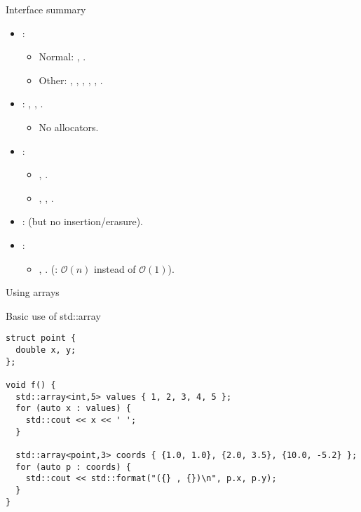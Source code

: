\begin{frame}[t]{Interface summary}
  \begin{itemize}
    \item {}:
      \begin{itemize}
        \item Normal: , .
        \item Other: 
              , ,
              , ,
              , .
      \end{itemize}

    \item {}: 
          , , .
      \begin{itemize}
        \item No allocators.
      \end{itemize}

    \item {}:
      \begin{itemize}
        \item {}, .
        \item {}, , .
      \end{itemize}

    \item {}:  (but no insertion/erasure).

    \item {}:
      \begin{itemize}
        \item {}, .
              (: $\mathcal{O}(n)$ instead of $\mathcal{O}(1)$).
      \end{itemize}
  \end{itemize}
\end{frame}

\begin{frame}[t,fragile]{Using arrays}
\begin{block}{Basic use of std::array}
\begin{lstlisting}
struct point {
  double x, y;
};

void f() {
  std::array<int,5> values { 1, 2, 3, 4, 5 };
  for (auto x : values) {
    std::cout << x << ' ';
  }

  std::array<point,3> coords { {1.0, 1.0}, {2.0, 3.5}, {10.0, -5.2} };
  for (auto p : coords) {
    std::cout << std::format("({} , {})\n", p.x, p.y);
  }
}
\end{lstlisting}
\end{block}
\end{frame}


